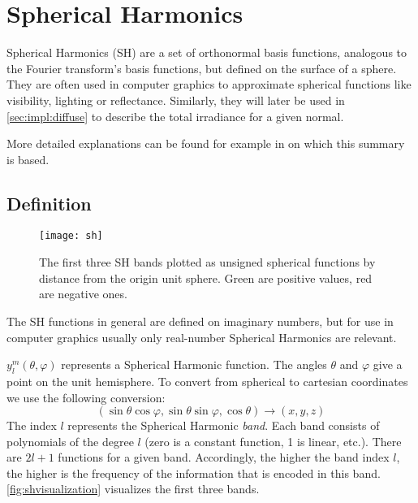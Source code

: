 \documentclass[thesis.tex]{subfiles}
\begin{document}
\section{Spherical Harmonics}\label{sec:preq:sh}
Spherical Harmonics (SH) are a set of orthonormal basis functions, analogous to the Fourier transform's basis functions, but defined on the surface of a sphere.
They are often used in computer graphics to approximate spherical functions like visibility, lighting or reflectance. Similarly, they will later be used in \autoref{sec:impl:diffuse} to describe the total irradiance for a given normal.

More detailed explanations can be found for example in \cite{bib:grittysh, bib:stupidsh} on which this summary is based.

\subsection{Definition} \label{chap:sh:def}
\begin{figure}[h]
	\centering
	\texttt{[image: sh]}
	\caption{\cite{bib:grittysph} The first three SH bands plotted as unsigned spherical functions by distance from the origin unit sphere. Green are positive values, red are negative ones.}
	\label{fig:shvisualization}
\end{figure}
The SH functions in general are defined on imaginary numbers, but for use in computer graphics usually only real-number Spherical Harmonics are relevant.

$y^m_l(\theta, \varphi)$ represents a Spherical Harmonic function.
The angles $\theta$ and $\varphi$ give a point on the unit hemisphere.
To convert from spherical to cartesian coordinates we use the following conversion:
\begin{equation} \label{equ:postoangle}
(\sin\theta\cos\varphi, \sin\theta\sin\varphi, \cos\theta) \rightarrow (x,y,z)
\end{equation}
The index $l$ represents the Spherical Harmonic \emph{band}.
Each band consists of polynomials of the degree $l$ (zero is a constant function, 1 is linear, etc.).
There are $2l+1$ functions for a given band.
Accordingly, the higher the band index $l$, the higher is the frequency of the information that is encoded in this band.
\autoref{fig:shvisualization} visualizes the first three bands.
\end{document}
